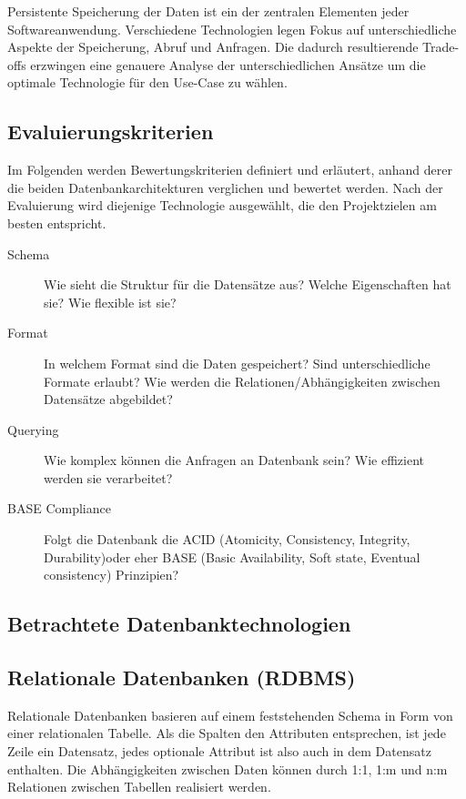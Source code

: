 Persistente Speicherung der Daten ist ein der zentralen Elementen jeder Softwareanwendung. Verschiedene Technologien legen Fokus auf unterschiedliche Aspekte der Speicherung, Abruf und Anfragen. Die dadurch resultierende Trade-offs erzwingen eine genauere Analyse der unterschiedlichen Ansätze um die optimale Technologie für den Use-Case zu wählen.

\subsection{Evaluierungskriterien}
Im Folgenden werden Bewertungskriterien definiert und erläutert, anhand derer die beiden Datenbankarchitekturen verglichen und bewertet werden. Nach der Evaluierung wird diejenige Technologie ausgewählt, die den Projektzielen am besten entspricht.

\begin{description}
    \item [Schema]
    Wie sieht die Struktur für die  Datensätze aus? Welche Eigenschaften hat sie? Wie flexible ist sie?
    \item [Format]
    In welchem Format sind die Daten gespeichert? Sind unterschiedliche Formate erlaubt? Wie werden die Relationen/Abhängigkeiten zwischen Datensätze abgebildet?
    \item [Querying]
    Wie komplex können die Anfragen an Datenbank sein? Wie effizient werden sie verarbeitet?
    \item [BASE Compliance]
    Folgt die Datenbank die ACID (Atomicity, Consistency, Integrity, Durability)oder eher BASE (Basic Availability, Soft state, Eventual consistency) Prinzipien?
\end{description}
\subsection{Betrachtete Datenbanktechnologien}
\subsection*{\textbf{Relationale Datenbanken (RDBMS)}}
Relationale Datenbanken basieren auf einem feststehenden Schema in Form von einer relationalen Tabelle. Als die Spalten den Attributen entsprechen, ist jede Zeile ein Datensatz, jedes optionale Attribut ist also auch in dem Datensatz enthalten. Die Abhängigkeiten zwischen Daten können durch 1:1, 1:m und n:m Relationen zwischen Tabellen realisiert werden. 

